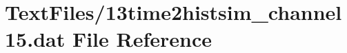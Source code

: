 \hypertarget{13time2histsim__channel15_8dat}{}\section{Text\+Files/13time2histsim\+\_\+channel15.dat File Reference}
\label{13time2histsim__channel15_8dat}
